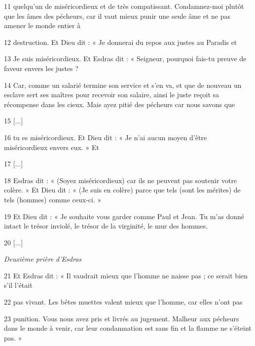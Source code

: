 \par 11 quelqu'un de miséricordieux et de très compatissant. Condamnez-moi plutôt que les âmes des pécheurs, car il vaut mieux punir une seule âme et ne pas amener le monde entier à

\par 12 destruction. Et Dieu dit : « Je donnerai du repos aux justes au Paradis et

\par 13 Je suis miséricordieux. Et Esdras dit : « Seigneur, pourquoi fais-tu preuve de faveur envers les justes ?

\par 14 Car, comme un salarié termine son service et s'en va, et que de nouveau un esclave sert ses maîtres pour recevoir son salaire, ainsi le juste reçoit sa récompense dans les cieux. Mais ayez pitié des pécheurs car nous savons que

\par 15 [...]

\par 16 tu es miséricordieux. Et Dieu dit : « Je n’ai aucun moyen d’être miséricordieux envers eux. » Et

\par 17 [...]

\par 18 Esdras dit : « (Soyez miséricordieux) car ils ne peuvent pas soutenir votre colère. » Et Dieu dit : « (Je suis en colère) parce que tels (sont les mérites) de tels (hommes) comme ceux-ci. »

\par 19 Et Dieu dit : « Je souhaite vous garder comme Paul et Jean. Tu m'as donné intact le trésor inviolé, le trésor de la virginité, le mur des hommes.

\par 20 [...]

\par \textit{Deuxième prière d'Esdras}

\par 21 Et Esdras dit : « Il vaudrait mieux que l'homme ne naisse pas ; ce serait bien s'il l'était

\par 22 pas vivant. Les bêtes muettes valent mieux que l'homme, car elles n'ont pas

\par 23 punition. Vous nous avez pris et livrés au jugement. Malheur aux pécheurs dans le monde à venir, car leur condamnation est sans fin et la flamme ne s’éteint pas. »

